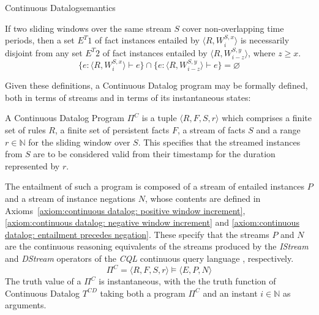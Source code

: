\begin{nestedsection}{Continuous Datalog}{semantics}
\begin{axiom}\label{axiom:continuous datalog: entailment disjointness}
If two sliding windows over the same stream $S$ cover non-overlapping time periods,
then a set ${E^T1}$ of fact instances entailed by ${\langle R, W^{S,x}_i \rangle}$
is necessarily disjoint from any set ${E^T2}$ of fact instances entailed by
${\langle R, W^{S,y}_{i-z} \rangle}$, where ${z \geq x}$.
\[ \{ e : \langle R , W^{S,x}_i \rangle \vdash e \} \cap \{ e : \langle R , W^{S,y}_{i-z} \rangle \vdash e \} = \varnothing \]
\end{axiom}

Given these definitions, a Continuous Datalog program may be formally
defined, both in terms of streams and in terms of its instantaneous
states:

\begin{definition}\label{def:continuous datalog: CDP}
A Continuous Datalog Program $\Pi^C$ is a tuple ${\langle R, F, S, r
\rangle}$ which comprises a finite set of rules $R$, a finite set of persistent
facts $F$, a stream of facts $S$ and a range ${r \in \mathbb{N}}$ for
the sliding window over $S$. This specifies that the streamed instances from $S$ are
to be considered valid from their timestamp for the duration represented
by $r$.

The entailment of such a program is composed of a stream of entailed
instances $P$ and a stream of instance negations $N$, whose contents
are defined in 
Axioms~\ref{axiom:continuous datalog: positive window increment}, 
\ref{axiom:continuous datalog: negative window increment} and
\ref{axiom:continuous datalog: entailment precedes negation}. 
These specify that the streams $P$ and $N$ are the continuous
reasoning equivalents of the streams produced by the \emph{IStream}
and \emph{DStream} operators of the \emph{CQL} continuous query
language \citep{CQL}, respectively.
\[ \Pi^C = \langle R, F, S, r \rangle \vDash \langle E, P, N \rangle \]
The truth value of a $\Pi^C$ is instantaneous, with the the truth
function of Continuous Datalog $T^{CD}$ taking both a program ${\Pi^C}$
and an instant ${i \in \mathbb{N}}$ as arguments.
\end{definition}


\end{nestedsection}
